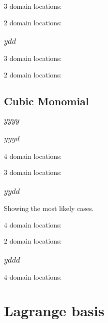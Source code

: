 $3$ domain locations:


$2$ domain locations:


\subsubsection{$ydd$}

$3$ domain locations:


$2$ domain locations:



\subsection{Cubic Monomial}

\subsubsection{$yyyy$}



\subsubsection{$yyyd$}

$4$ domain locations:


$3$ domain locations:


\subsubsection{$yydd$}

Showing the most likely cases.

$4$ domain locations:


$2$ domain locations:


\subsubsection{$yddd$}
$4$ domain locations:



\restoregeometry
  

\section{Lagrange basis}

